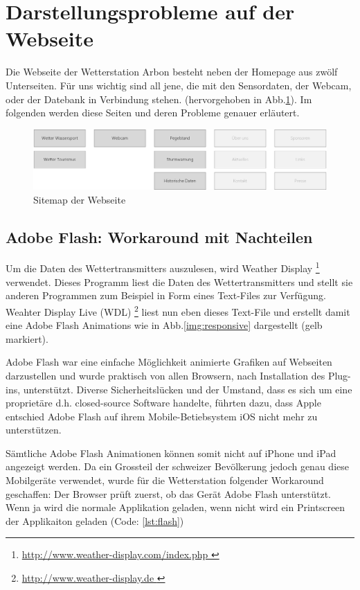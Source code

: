 \section{Darstellungsprobleme auf der Webseite}
Die Webseite der Wetterstation Arbon besteht neben der Homepage aus zwölf Unterseiten. Für uns wichtig sind all jene, die mit den Sensordaten, der Webcam, oder der Datebank in Verbindung stehen. (hervorgehoben in Abb.\ref{img:sitemap}). Im folgenden werden diese Seiten und deren Probleme genauer erläutert.

\begin{figure}[h!]
	\centering
	\includegraphics[width=0.9\linewidth]{img/sitemap}
	\caption{Sitemap der Webseite}
	\label{img:sitemap}
\end{figure}


\subsection{Adobe Flash: Workaround mit Nachteilen}

Um die Daten des Wettertransmitters auszulesen, wird Weather Display \footnote{ \url{http://www.weather-display.com/index.php }} verwendet. Dieses Programm liest die Daten des Wettertransmitters und stellt sie anderen Programmen zum Beispiel in Form eines Text-Files zur Verfügung. Weahter Display Live (WDL) \footnote{ \url{http://www.weather-display.de }} liest nun eben dieses Text-File und erstellt damit eine Adobe Flash Animations wie in Abb.\ref{img:responsive} dargestellt (gelb markiert).

Adobe Flash war eine einfache Möglichkeit animierte Grafiken auf Webseiten darzustellen und wurde praktisch von allen Browsern, nach Installation des Plug-ins, unterstützt. Diverse Sicherheitslücken und der Umstand, dass es sich um eine proprietäre d.h. closed-source Software handelte, führten dazu, dass Apple entschied Adobe Flash auf ihrem Mobile-Betiebsystem iOS nicht mehr zu unterstützen. \cite{Apple:ThoughtsOnFlash} 

Sämtliche Adobe Flash Animationen können somit nicht auf iPhone und iPad angezeigt werden. Da ein Grossteil der schweizer Bevölkerung jedoch genau diese Mobilgeräte verwendet, wurde für die Wetterstation folgender Workaround geschaffen: Der Browser prüft zuerst, ob das Gerät Adobe Flash unterstützt. Wenn ja wird die normale Applikation geladen, wenn nicht wird ein Printscreen der Applikaiton geladen (Code: \ref{lst:flash})

